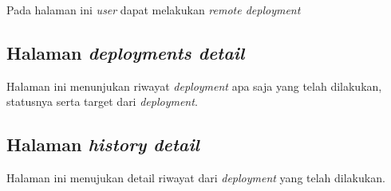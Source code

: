Pada halaman ini \textit{user} dapat melakukan \textit{remote deployment}

\subsection{Halaman \textit{deployments detail}}

Halaman ini menunjukan riwayat \textit{deployment} apa saja yang telah dilakukan, statusnya serta target dari \textit{deployment}.

\subsection{Halaman \textit{history detail}}

Halaman ini menujukan detail riwayat dari \textit{deployment} yang telah dilakukan.

